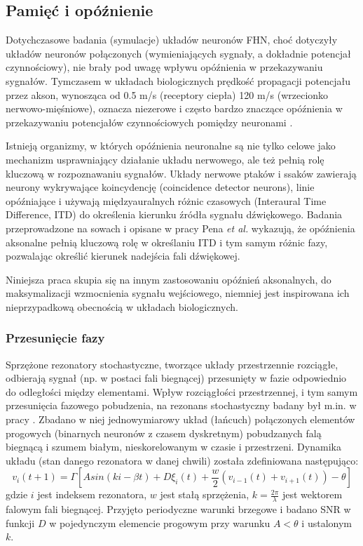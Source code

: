   \subsection{Pamięć i opóźnienie}
  
  Dotychczasowe badania (symulacje) układów neuronów FHN, choć dotyczyły układów neuronów połączonych (wymieniających sygnały, a dokładnie potencjał czynnościowy), nie brały pod uwagę wpływu opóźnienia w przekazywaniu sygnałów. Tymczasem w układach biologicznych prędkość propagacji potencjału przez akson, wynosząca od 0.5 m/s (receptory ciepła) 120 m/s (wrzecionko nerwowo-mięśniowe), oznacza niezerowe i często bardzo znaczące opóźnienia w przekazywaniu potencjałów czynnościowych pomiędzy neuronami \cite{kandel}.

  Istnieją organizmy, w których opóźnienia neuronalne są nie tylko celowe jako mechanizm usprawniający działanie układu nerwowego, ale też pełnią rolę kluczową w rozpoznawaniu sygnałów. Układy nerwowe ptaków i ssaków zawierają neurony wykrywające koincydencję (coincidence detector neurons), linie opóźniające i używają międzyauralnych różnic czasowych (Interaural Time Difference, ITD) do określenia kierunku źródła sygnału dźwiękowego. Badania przeprowadzone na sowach i opisane w pracy Pena \emph{et al.} \cite{pena} wykazują, że opóźnienia aksonalne pełnią kluczową rolę w określaniu ITD i tym samym różnic fazy, pozwalając określić kierunek nadejścia fali dźwiękowej.

  Niniejsza praca skupia się na innym zastosowaniu opóźnień aksonalnych, do maksymalizacji wzmocnienia sygnału wejściowego, niemniej jest inspirowana ich nieprzypadkową obecnością w układach biologicznych.
  

  \subsubsection{Przesunięcie fazy}
  \label{sec:przesuniecie_fazy}

  Sprzężone rezonatory stochastyczne, tworzące układy przestrzennie rozciągłe, odbierają sygnał (np. w postaci fali biegnącej) przesunięty w fazie odpowiednio do odległości między elementami. Wpływ rozciągłości przestrzennej, i tym samym przesunięcia fazowego pobudzenia, na rezonans stochastyczny badany był m.in. w pracy \cite{ijmpb_14_8}. Zbadano w niej jednowymiarowy układ (łańcuch) połączonych elementów progowych (binarnych neuronów z czasem dyskretnym) pobudzanych falą biegnącą i szumem białym, nieskorelowanym w czasie i przestrzeni. Dynamika układu (stan danego rezonatora w danej chwili) została zdefiniowana następująco:
  \begin{equation} \label{sr:jezo:1}
    v_i (t+1) = \Gamma [A sin (ki - \beta t) + D \xi_i (t) + \frac{w}{2}(v_{i-1}(t) + v_{i+1}(t)) - \theta]
  \end{equation}
  gdzie $i$ jest indeksem rezonatora, $w$ jest stałą sprzężenia, $k = \frac{2 \pi}{\lambda}$ jest wektorem falowym fali biegnącej. Przyjęto periodyczne warunki brzegowe i badano SNR w funkcji $D$ w pojedynczym elemencie progowym przy warunku $A < \theta$ i ustalonym $k$.

